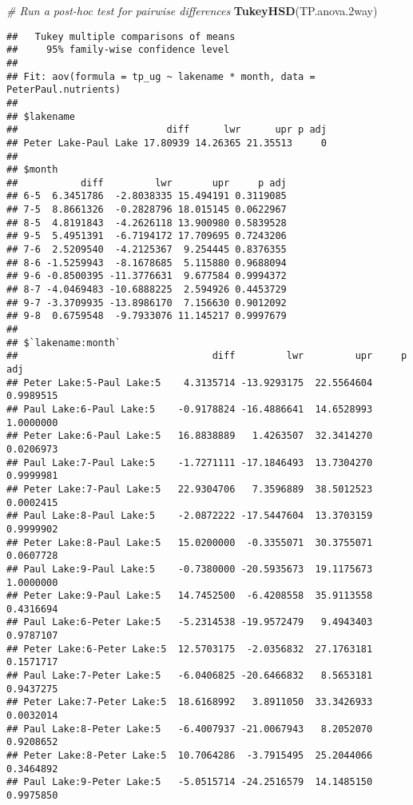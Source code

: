 \documentclass[
]{article}
\newenvironment{Shaded}{\begin{snugshade}}{\end{snugshade}}
\newcommand{\CommentTok}[1]{\textcolor[rgb]{0.56,0.35,0.01}{\textit{#1}}}
\newcommand{\FloatTok}[1]{\textcolor[rgb]{0.00,0.00,0.81}{#1}}
\newcommand{\KeywordTok}[1]{\textcolor[rgb]{0.13,0.29,0.53}{\textbf{#1}}}
\newcommand{\NormalTok}[1]{#1}
\begin{document}
\begin{Shaded}
\begin{Highlighting}[]
\CommentTok{# Run a post-hoc test for pairwise differences}
\KeywordTok{TukeyHSD}\NormalTok{(TP.anova}\FloatTok{.2}\NormalTok{way)}
\end{Highlighting}
\end{Shaded}

\begin{verbatim}
##   Tukey multiple comparisons of means
##     95% family-wise confidence level
## 
## Fit: aov(formula = tp_ug ~ lakename * month, data = PeterPaul.nutrients)
## 
## $lakename
##                          diff      lwr      upr p adj
## Peter Lake-Paul Lake 17.80939 14.26365 21.35513     0
## 
## $month
##           diff         lwr       upr     p adj
## 6-5  6.3451786  -2.8038335 15.494191 0.3119085
## 7-5  8.8661326  -0.2828796 18.015145 0.0622967
## 8-5  4.8191843  -4.2626118 13.900980 0.5839528
## 9-5  5.4951391  -6.7194172 17.709695 0.7243206
## 7-6  2.5209540  -4.2125367  9.254445 0.8376355
## 8-6 -1.5259943  -8.1678685  5.115880 0.9688094
## 9-6 -0.8500395 -11.3776631  9.677584 0.9994372
## 8-7 -4.0469483 -10.6888225  2.594926 0.4453729
## 9-7 -3.3709935 -13.8986170  7.156630 0.9012092
## 9-8  0.6759548  -9.7933076 11.145217 0.9997679
## 
## $`lakename:month`
##                                  diff         lwr         upr     p adj
## Peter Lake:5-Paul Lake:5    4.3135714 -13.9293175  22.5564604 0.9989515
## Paul Lake:6-Paul Lake:5    -0.9178824 -16.4886641  14.6528993 1.0000000
## Peter Lake:6-Paul Lake:5   16.8838889   1.4263507  32.3414270 0.0206973
## Paul Lake:7-Paul Lake:5    -1.7271111 -17.1846493  13.7304270 0.9999981
## Peter Lake:7-Paul Lake:5   22.9304706   7.3596889  38.5012523 0.0002415
## Paul Lake:8-Paul Lake:5    -2.0872222 -17.5447604  13.3703159 0.9999902
## Peter Lake:8-Paul Lake:5   15.0200000  -0.3355071  30.3755071 0.0607728
## Paul Lake:9-Paul Lake:5    -0.7380000 -20.5935673  19.1175673 1.0000000
## Peter Lake:9-Paul Lake:5   14.7452500  -6.4208558  35.9113558 0.4316694
## Paul Lake:6-Peter Lake:5   -5.2314538 -19.9572479   9.4943403 0.9787107
## Peter Lake:6-Peter Lake:5  12.5703175  -2.0356832  27.1763181 0.1571717
## Paul Lake:7-Peter Lake:5   -6.0406825 -20.6466832   8.5653181 0.9437275
## Peter Lake:7-Peter Lake:5  18.6168992   3.8911050  33.3426933 0.0032014
## Paul Lake:8-Peter Lake:5   -6.4007937 -21.0067943   8.2052070 0.9208652
## Peter Lake:8-Peter Lake:5  10.7064286  -3.7915495  25.2044066 0.3464892
## Paul Lake:9-Peter Lake:5   -5.0515714 -24.2516579  14.1485150 0.9975850

\end{verbatim}
\end{document}
